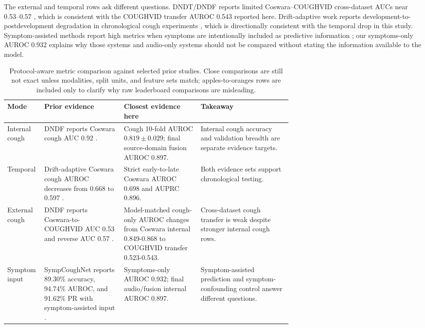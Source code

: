 \documentclass[preprint,12pt]{elsarticle}
\begin{document}
The external and temporal rows ask different questions. DNDT/DNDF reports limited Coswara--COUGHVID cross-dataset AUCs near 0.53--0.57 \citep{islam2026dndf}, which is consistent with the COUGHVID transfer AUROC 0.543 reported here. Drift-adaptive work reports development-to-postdevelopment degradation in chronological cough experiments \citep{ganitidis2025drift}, which is directionally consistent with the temporal drop in this study. Symptom-assisted methods report high metrics when symptoms are intentionally included as predictive information \citep{lin2025sympcoughnet}; our symptoms-only AUROC 0.932 explains why those systems and audio-only systems should not be compared without stating the information available to the model.

\begin{table}[t]
\centering
\caption{Protocol-aware metric comparison against selected prior studies. Close comparisons are still not exact unless modalities, split units, and feature sets match; apples-to-oranges rows are included only to clarify why raw leaderboard comparisons are misleading.}
\label{tab:metric-comparison}
\scriptsize
\setlength{\tabcolsep}{2.5pt}
\begin{tabularx}{\linewidth}{p{0.13\linewidth} p{0.28\linewidth} p{0.27\linewidth} X}
\toprule
Mode & Prior evidence & Closest evidence here & Takeaway \\
\midrule
Internal cough & DNDF reports Coswara cough AUC 0.92 \citep{islam2026dndf}. & Cough 10-fold AUROC $0.819 \pm 0.029$; final source-domain fusion AUROC 0.897. & Internal cough accuracy and validation breadth are separate evidence targets. \\
Temporal & Drift-adaptive Coswara cough AUROC decreases from 0.668 to 0.597 \citep{ganitidis2025drift}. & Strict early-to-late Coswara AUROC 0.698 and AUPRC 0.896. & Both evidence sets support chronological testing. \\
External cough & DNDF reports Coswara-to-COUGHVID AUC 0.53 and reverse AUC 0.57 \citep{islam2026dndf}. & Model-matched cough-only AUROC changes from Coswara internal 0.849-0.868 to COUGHVID transfer 0.523-0.543. & Cross-dataset cough transfer is weak despite stronger internal cough rows. \\
Symptom input & SympCoughNet reports 89.30\% accuracy, 94.74\% AUROC, and 91.62\% PR with symptom-assisted input \citep{lin2025sympcoughnet}. & Symptoms-only AUROC 0.932; final audio/fusion internal AUROC 0.897. & Symptom-assisted prediction and symptom-confounding control answer different questions. \\
\bottomrule
\end{tabularx}
\end{table}
\end{document}
